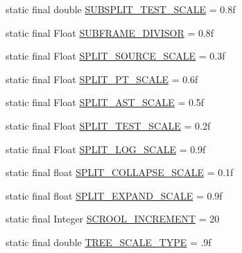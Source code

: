 \begin{DoxyCompactItemize}
\item 
static final double \hyperlink{classit_1_1emarolab_1_1cagg_1_1debugging_1_1DebuggingDefaults_a8c408f05f2fa4713302830f8a11238e5}{S\-U\-B\-S\-P\-L\-I\-T\-\_\-\-T\-E\-S\-T\-\_\-\-S\-C\-A\-L\-E} = 0.\-8f
\item 
static final Float \hyperlink{classit_1_1emarolab_1_1cagg_1_1debugging_1_1DebuggingDefaults_a997074e0a71f9a7b3d1e994a71930cc4}{S\-U\-B\-F\-R\-A\-M\-E\-\_\-\-D\-I\-V\-I\-S\-O\-R} = 0.\-8f
\item 
static final Float \hyperlink{classit_1_1emarolab_1_1cagg_1_1debugging_1_1DebuggingDefaults_aa08b19d8b87d4202ffb95a5166fdbe2a}{S\-P\-L\-I\-T\-\_\-\-S\-O\-U\-R\-C\-E\-\_\-\-S\-C\-A\-L\-E} = 0.\-3f
\item 
static final Float \hyperlink{classit_1_1emarolab_1_1cagg_1_1debugging_1_1DebuggingDefaults_a92f2cacd93d768ea93bb352212a3041f}{S\-P\-L\-I\-T\-\_\-\-P\-T\-\_\-\-S\-C\-A\-L\-E} = 0.\-6f
\item 
static final Float \hyperlink{classit_1_1emarolab_1_1cagg_1_1debugging_1_1DebuggingDefaults_a966c4e9378b69ec91c93037309dabf94}{S\-P\-L\-I\-T\-\_\-\-A\-S\-T\-\_\-\-S\-C\-A\-L\-E} = 0.\-5f
\item 
static final Float \hyperlink{classit_1_1emarolab_1_1cagg_1_1debugging_1_1DebuggingDefaults_ae1479cc72b04e9e455ec26a92c378a28}{S\-P\-L\-I\-T\-\_\-\-T\-E\-S\-T\-\_\-\-S\-C\-A\-L\-E} = 0.\-2f
\item 
static final Float \hyperlink{classit_1_1emarolab_1_1cagg_1_1debugging_1_1DebuggingDefaults_a03575ca73c5c42d6d8f6a4433ff9db73}{S\-P\-L\-I\-T\-\_\-\-L\-O\-G\-\_\-\-S\-C\-A\-L\-E} = 0.\-9f
\item 
static final float \hyperlink{classit_1_1emarolab_1_1cagg_1_1debugging_1_1DebuggingDefaults_a44caf35f6fb485e185202177f3b02972}{S\-P\-L\-I\-T\-\_\-\-C\-O\-L\-L\-A\-P\-S\-E\-\_\-\-S\-C\-A\-L\-E} = 0.\-1f
\item 
static final float \hyperlink{classit_1_1emarolab_1_1cagg_1_1debugging_1_1DebuggingDefaults_ab77fc428ffc6607d3821c79b96ec0121}{S\-P\-L\-I\-T\-\_\-\-E\-X\-P\-A\-N\-D\-\_\-\-S\-C\-A\-L\-E} = 0.\-9f
\item 
static final Integer \hyperlink{classit_1_1emarolab_1_1cagg_1_1debugging_1_1DebuggingDefaults_af6ac0641daa3d8979c1a4f0254efd2ac}{S\-C\-R\-O\-O\-L\-\_\-\-I\-N\-C\-R\-E\-M\-E\-N\-T} = 20
\item 
static final double \hyperlink{classit_1_1emarolab_1_1cagg_1_1debugging_1_1DebuggingDefaults_a63d086f918822ab4a3e70f62b6a5f8a2}{T\-R\-E\-E\-\_\-\-S\-C\-A\-L\-E\-\_\-\-T\-Y\-P\-E} = .\-9f

\end{DoxyCompactItemize}
